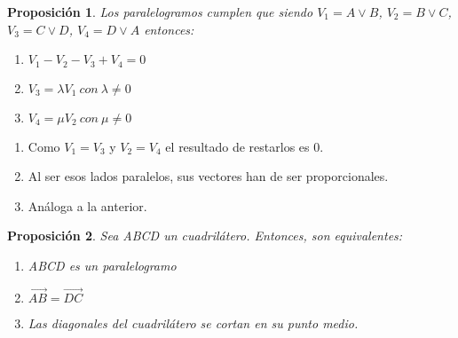 \documentclass[11pt, a4paper]{article}
\makeatletter
\newif\IfInSansMode
\let\oldsf\sffamily
\renewcommand*{\sffamily}{\oldsf\mathversion{sans}\InSansModetrue}
\let\oldnorm\normalfont
\renewcommand*{\normalfont}{\oldnorm\InSansModefalse\mathversion{normal}}
\renewenvironment{proof}[1][\proofname] {\vspace{-15pt}\par\pushQED{\qed}\normalfont\topsep6\p@\@plus6\p@\relax\trivlist\item[\hskip\labelsep\it#1\@addpunct{.}]\ignorespaces}{\popQED\endtrivlist\@endpefalse}
\renewcommand{\vec}{\overrightarrow}
\renewenvironment{proof}[1][\proofname] {\par\pushQED{\qed}\normalfont\topsep6\p@\@plus6\p@\relax\trivlist\item[\hskip\labelsep\itshape\sffamily#1\@addpunct{.}]\ignorespaces}{\popQED\endtrivlist\@endpefalse}
\theoremstyle{theorem-style}
\newtheorem{nprop}{Proposición}[section]
\theoremstyle{definition-style}
\theoremstyle{remark-style}
\theoremstyle{example-style}
\newenvironment{nlist}
{\begin{enumerate}
    \renewcommand\labelenumi{(\emph{\roman{enumi})}}}
  {\end{enumerate}}
\makeatother
\begin{document}
\hfill

\begin{nprop}
	Los paralelogramos cumplen que
  siendo $V_{1} = A \vee B$, $V_{2} = B \vee C$, $V_{3} = C\vee D$, $V_{4} = D \vee A$ entonces:
  \begin{nlist}
  \item $V_{1} - V_{2} - V_{3} + V_{4} = 0$
  \item $V_{3} = \lambda V_{1}\ con\ \lambda \neq 0$
  \item $V_{4} = \mu V_{2}\ con\ \mu \neq 0$
  \end{nlist}
\end{nprop}

\begin{proof} \hfill
	\begin{nlist} 
		\item Como $V_1 = V_3$ y $V_2 = V_4$ el resultado de restarlos es $0$.
		\item Al ser esos lados paralelos, sus vectores han de ser proporcionales.
		\item Análoga a la anterior.
	\end{nlist}
\end{proof}


\begin{nprop}
  Sea ABCD un cuadrilátero. Entonces, son equivalentes:
  \begin{nlist}
  \item ABCD es un paralelogramo
  \item $\vec{AB} = \vec{DC}$
  \item Las diagonales del cuadrilátero se cortan en su punto medio.
  \end{nlist}
\end{nprop}
\end{document}
